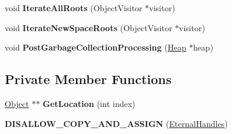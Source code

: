 \begin{DoxyCompactItemize}
\item 
void {\bfseries Iterate\+All\+Roots} (Object\+Visitor $\ast$visitor)\hypertarget{classv8_1_1internal_1_1_eternal_handles_a9f411f6a9b612dacf6e40bba71a91796}{}\label{classv8_1_1internal_1_1_eternal_handles_a9f411f6a9b612dacf6e40bba71a91796}

\item 
void {\bfseries Iterate\+New\+Space\+Roots} (Object\+Visitor $\ast$visitor)\hypertarget{classv8_1_1internal_1_1_eternal_handles_aea775603d28824996a43ca0e2781f7aa}{}\label{classv8_1_1internal_1_1_eternal_handles_aea775603d28824996a43ca0e2781f7aa}

\item 
void {\bfseries Post\+Garbage\+Collection\+Processing} (\hyperlink{classv8_1_1internal_1_1_heap}{Heap} $\ast$heap)\hypertarget{classv8_1_1internal_1_1_eternal_handles_a895a3eeda0f0942c67b78e3cf049010d}{}\label{classv8_1_1internal_1_1_eternal_handles_a895a3eeda0f0942c67b78e3cf049010d}

\end{DoxyCompactItemize}
\subsection*{Private Member Functions}
\begin{DoxyCompactItemize}
\item 
\hyperlink{classv8_1_1internal_1_1_object}{Object} $\ast$$\ast$ {\bfseries Get\+Location} (int index)\hypertarget{classv8_1_1internal_1_1_eternal_handles_aef9db615195217a8dd09d333653c62a0}{}\label{classv8_1_1internal_1_1_eternal_handles_aef9db615195217a8dd09d333653c62a0}

\item 
{\bfseries D\+I\+S\+A\+L\+L\+O\+W\+\_\+\+C\+O\+P\+Y\+\_\+\+A\+N\+D\+\_\+\+A\+S\+S\+I\+GN} (\hyperlink{classv8_1_1internal_1_1_eternal_handles}{Eternal\+Handles})\hypertarget{classv8_1_1internal_1_1_eternal_handles_a71eea997fe43b24d630d0d3bd429d441}{}\label{classv8_1_1internal_1_1_eternal_handles_a71eea997fe43b24d630d0d3bd429d441}

\end{DoxyCompactItemize}
